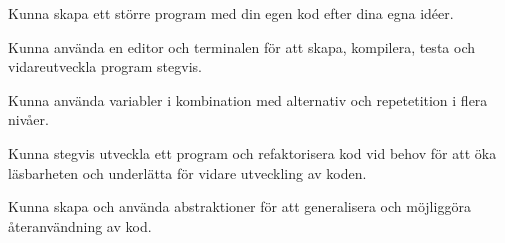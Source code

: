 
\item Kunna skapa ett större program med din egen kod efter dina egna idéer.
\item Kunna använda en editor och terminalen för att skapa, kompilera, testa och vidareutveckla program stegvis.
\item Kunna använda variabler i kombination med alternativ och repetetition i flera nivåer.
\item Kunna stegvis utveckla ett program och refaktorisera kod vid behov för att öka läsbarheten och underlätta för vidare utveckling av koden.
\item Kunna skapa och använda abstraktioner för att generalisera och möjliggöra återanvändning av kod.
